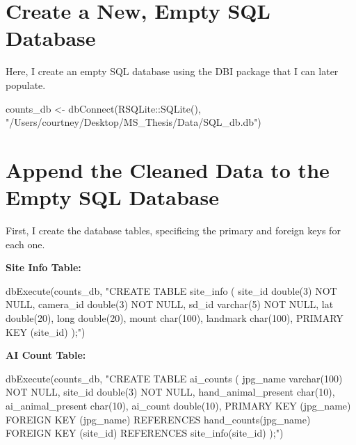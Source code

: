 \documentclass[
]{book}
\newenvironment{Shaded}{\begin{snugshade}}{\end{snugshade}}
\newcommand{\FunctionTok}[1]{\textcolor[rgb]{0.00,0.00,0.00}{#1}}
\newcommand{\NormalTok}[1]{#1}
\newcommand{\OtherTok}[1]{\textcolor[rgb]{0.56,0.35,0.01}{#1}}
\newcommand{\SpecialCharTok}[1]{\textcolor[rgb]{0.00,0.00,0.00}{#1}}
\newcommand{\StringTok}[1]{\textcolor[rgb]{0.31,0.60,0.02}{#1}}
\begin{document}
\hypertarget{create-a-new-empty-sql-database}{%
\section{Create a New, Empty SQL Database}\label{create-a-new-empty-sql-database}}

Here, I create an empty SQL database using the DBI package that I can later populate.

\begin{Shaded}
\begin{Highlighting}[]
\NormalTok{counts\_db }\OtherTok{\textless{}{-}} \FunctionTok{dbConnect}\NormalTok{(RSQLite}\SpecialCharTok{::}\FunctionTok{SQLite}\NormalTok{(), }\StringTok{"/Users/courtney/Desktop/MS\_Thesis/Data/SQL\_db.db"}\NormalTok{)}
\end{Highlighting}
\end{Shaded}

\hypertarget{append-the-cleaned-data-to-the-empty-sql-database}{%
\section{Append the Cleaned Data to the Empty SQL Database}\label{append-the-cleaned-data-to-the-empty-sql-database}}

First, I create the database tables, specificing the primary and foreign keys for each one.

\textbf{Site Info Table:}

\begin{Shaded}
\begin{Highlighting}[]
\FunctionTok{dbExecute}\NormalTok{(counts\_db, }
\StringTok{"CREATE TABLE site\_info (}
\StringTok{ site\_id double(3) NOT NULL,}
\StringTok{ camera\_id double(3) NOT NULL,}
\StringTok{ sd\_id varchar(5) NOT NULL,}
\StringTok{ lat double(20),}
\StringTok{ long double(20),}
\StringTok{ mount char(100),}
\StringTok{ landmark   char(100),}
\StringTok{ PRIMARY KEY (site\_id)}
\StringTok{);"}\NormalTok{)}
\end{Highlighting}
\end{Shaded}

\textbf{AI Count Table:}

\begin{Shaded}
\begin{Highlighting}[]
\FunctionTok{dbExecute}\NormalTok{(counts\_db, }
\StringTok{"CREATE TABLE ai\_counts (}
\StringTok{ jpg\_name varchar(100) NOT NULL,}
\StringTok{ site\_id double(3) NOT NULL,}
\StringTok{ hand\_animal\_present char(10),}
\StringTok{ ai\_animal\_present char(10),}
\StringTok{ ai\_count double(10),}
\StringTok{ PRIMARY KEY (jpg\_name)}
\StringTok{ FOREIGN KEY (jpg\_name) REFERENCES hand\_counts(jpg\_name)}
\StringTok{ FOREIGN KEY (site\_id) REFERENCES site\_info(site\_id)}
\StringTok{);"}\NormalTok{)}
\end{Highlighting}
\end{Shaded}
\end{document}

